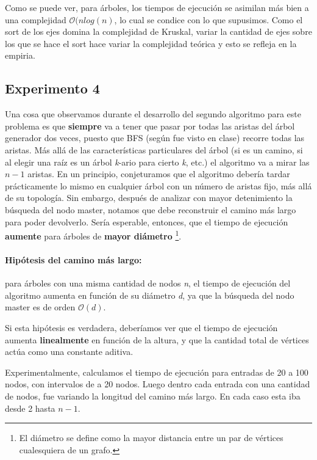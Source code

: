 \documentclass[a4paper]{report}
\begin{document}
Como se puede ver, para árboles, los tiempos de ejecución se asimilan más bien a una complejidad $\mathcal{O}(nlog(n)$, lo cual se condice con lo que supusimos. Como el sort de los ejes domina la complejidad de Kruskal, variar la cantidad de ejes sobre los que se hace el sort hace variar la complejidad teórica y esto se refleja en la empiria.

\subsection{Experimento 4}

Una cosa que observamos durante el desarrollo del segundo algoritmo para este problema es que \textbf{siempre} va a tener que pasar por todas las aristas del árbol generador dos veces, puesto que BFS (según fue visto en clase) recorre todas las aristas. Más allá de las características particulares del árbol (si es un camino, si al elegir una raíz es un árbol \textit{k}-ario para cierto \textit{k}, etc.) el algoritmo va a mirar las $n-1$ aristas. En un principio, conjeturamos que el algoritmo debería tardar prácticamente lo mismo en cualquier árbol con un número de aristas fijo, más allá de su topología. Sin embargo, después de analizar con mayor detenimiento la búsqueda del nodo master, notamos que debe reconstruir el camino más largo para poder devolverlo. Sería esperable, entonces, que el tiempo de ejecución \textbf{aumente} para árboles de \textbf{mayor diámetro} \footnote{El diámetro se define como la mayor distancia entre un par de vértices cualesquiera de un grafo.}.

\paragraph{Hipótesis del camino más largo: } para árboles con una misma cantidad de nodos \textit{n}, el tiempo de ejecución del algoritmo aumenta en función de su diámetro \textit{d}, ya que la búsqueda del nodo master es de orden $\mathcal{O}(d)$.

\medskip

Si esta hipótesis es verdadera, deberíamos ver que el tiempo de ejecución aumenta \textbf{linealmente} en función de la altura, y que la cantidad total de vértices actúa como una constante aditiva.

Experimentalmente, calculamos el tiempo de ejecución para entradas de 20 a 100 nodos, con intervalos de a 20 nodos. Luego dentro cada entrada con una cantidad de nodos, fue variando la longitud del camino más largo. En cada caso esta iba desde 2 hasta $n-1$. 
\end{document}
